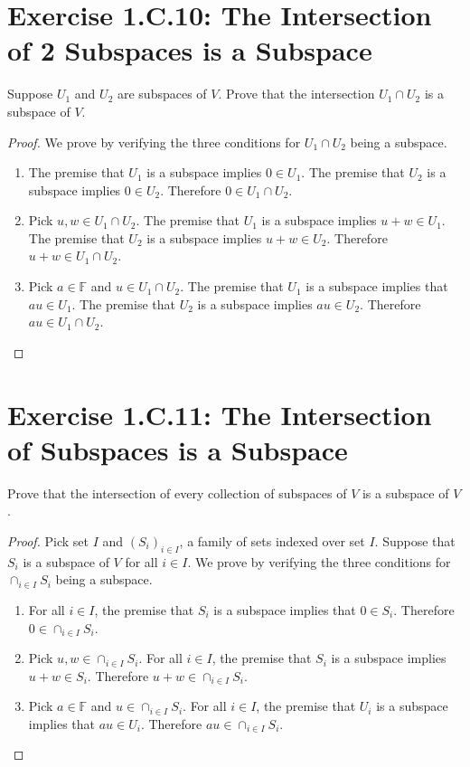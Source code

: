 \section{Exercise 1.C.10: The Intersection of 2 Subspaces is a Subspace}
Suppose $U_1$ and $U_2$ are subspaces of $V$. Prove that the intersection $U_1\cap U_2$ is a subspace of $V$.
\begin{proof}
We prove by verifying the three conditions for $U_1\cap U_2$ being a subspace.
\begin{enumerate}
\item The premise that $U_1$ is a subspace implies $0\in U_1$. The premise that $U_2$ is a subspace implies $0\in U_2$. Therefore $0\in U_1\cap U_2$.
\item Pick $u,w\in U_1\cap U_2$. The premise that $U_1$ is a subspace implies $u+w\in U_1$. The premise that $U_2$ is a subspace implies $u+w\in U_2$. Therefore $u+w\in U_1\cap U_2$.
\item Pick $a\in \mathbb{F}$ and $u\in U_1\cap U_2$. The premise that $U_1$ is a subspace implies that $au\in U_1$. The premise that $U_2$ is a subspace implies $au\in U_2$. Therefore $au\in U_1\cap U_2$.
\end{enumerate}
\end{proof}

\section{Exercise 1.C.11: The Intersection of Subspaces is a Subspace}
Prove that the intersection of every collection of subspaces of $V$ is a subspace of $V$.

\begin{proof}
Pick set $I$ and $(S_i)_{i\in I}$, a family of sets indexed over set $I$. Suppose that $S_i$ is a subspace of $V$ for all $i\in I$. We prove by verifying the three conditions for $\cap_{i\in I} S_i$ being a subspace.
\begin{enumerate}
\item For all $i\in I$, the premise that $S_i$ is a subspace implies that $0\in S_i$. Therefore $0\in \cap_{i\in I} S_i$.
\item Pick $u,w\in \cap_{i\in I} S_i$. For all $i\in I$, the premise that $S_i$ is a subspace implies $u+w\in S_i$. Therefore $u+w\in \cap_{i\in I} S_i$.
\item Pick $a\in \mathbb{F}$ and $u\in \cap_{i\in I} S_i$. For all $i\in I$, the premise that $U_i$ is a subspace implies that $au\in U_i$. Therefore $au\in \cap_{i\in I} S_i$.
\end{enumerate}
\end{proof}

